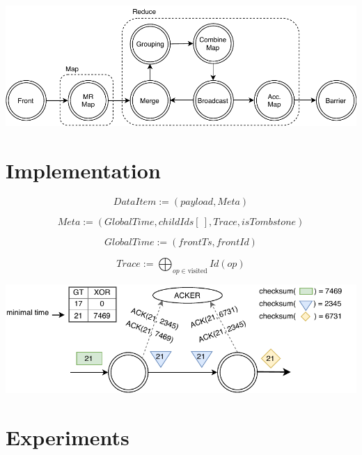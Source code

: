 \documentclass[a0,landscape]{a0poster}
\begin{document}
\begin{multicols*}{3}
\begin{minipage}{\linewidth}
  \centering
  \includegraphics[width=\linewidth]{pics/mapreduce}
\end{minipage}

\section*{Implementation}

\[DataItem := (payload, Meta)\]

\[Meta := (GlobalTime, childIds[\:], Trace, isTombstone)\]

\[GlobalTime := (frontTs, frontId)\]

\[Trace := \bigoplus_{op \in \text{visited}} Id(op)\]

\begin{minipage}{\linewidth}
  \centering
  \includegraphics[width=\linewidth]{pics/acker}
\end{minipage}

\section*{Experiments}


\end{multicols*}
\end{document}
